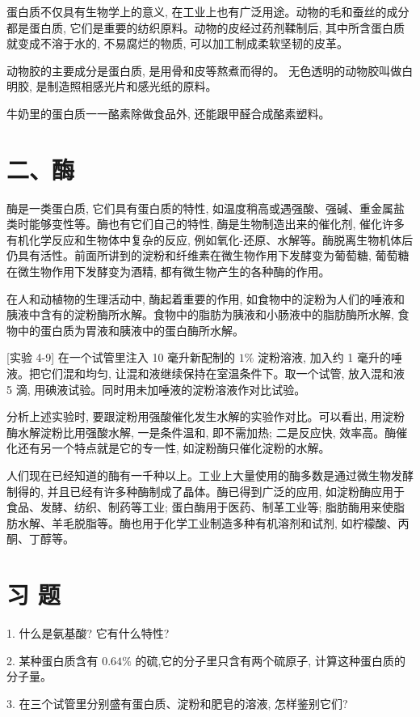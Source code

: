 \documentclass[10pt]{article}
\begin{document}
蛋白质不仅具有生物学上的意义, 在工业上也有广泛用途。动物的毛和蚕丝的成分都是蛋白质, 它们是重要的纺织原料。动物的皮经过药剂鞣制后, 其中所含蛋白质就变成不溶于水的, 不易腐烂的物质, 可以加工制成柔软坚韧的皮革。

动物胶的主要成分是蛋白质, 是用骨和皮等熬煮而得的。 无色透明的动物胶叫做白明胶, 是制造照相感光片和感光纸的原料。

牛奶里的蛋白质一一酪素除做食品外, 还能跟甲醛合成酪素塑料。

\section*{二、酶}

酶是一类蛋白质, 它们具有蛋白质的特性, 如温度稍高或遇强酸、强碱、重金属盐类时能够变性等。酶也有它们自己的特性, 酶是生物制造出来的催化剂, 催化许多有机化学反应和生物体中复杂的反应, 例如氧化-还原、水解等。酶脱离生物机体后仍具有活性。前面所讲到的淀粉和纤维素在微生物作用下发酵变为葡萄糖, 葡萄糖在微生物作用下发酵变为酒精, 都有微生物产生的各种酶的作用。

在人和动植物的生理活动中, 酶起着重要的作用, 如食物中的淀粉为人们的唾液和胰液中含有的淀粉酶所水解。食物中的脂肪为胰液和小肠液中的脂肪酶所水解, 食物中的蛋白质为胃液和胰液中的蛋白酶所水解。

[实验 4-9] 在一个试管里注入 10 毫升新配制的 \(1\%\) 淀粉溶液, 加入约 1 毫升的唾液。把它们混和均匀, 让混和液继续保持在室温条件下。取一个试管, 放入混和液 5 滴, 用碘液试验。同时用未加唾液的淀粉溶液作对比试验。

分析上述实验时, 要跟淀粉用强酸催化发生水解的实验作对比。可以看出, 用淀粉酶水解淀粉比用强酸水解, 一是条件温和, 即不需加热; 二是反应快, 效率高。酶催化还有另一个特点就是它的专一性, 如淀粉酶只催化淀粉的水解。

人们现在已经知道的酶有一千种以上。工业上大量使用的酶多数是通过微生物发酵制得的, 并且已经有许多种酶制成了晶体。酶已得到广泛的应用, 如淀粉酶应用于食品、发酵、纺织、制药等工业; 蛋白酶用于医药、制革工业等; 脂肪酶用来使脂肪水解、羊毛脱脂等。酶也用于化学工业制造多种有机溶剂和试剂, 如柠檬酸、丙酮、丁醇等。

\section*{习 题}

1. 什么是氨基酸? 它有什么特性?

2. 某种蛋白质含有 \({0.64}\%\) 的硫,它的分子里只含有两个硫原子, 计算这种蛋白质的分子量。

3. 在三个试管里分别盛有蛋白质、淀粉和肥皂的溶液, 怎样鉴别它们?
\end{document}
